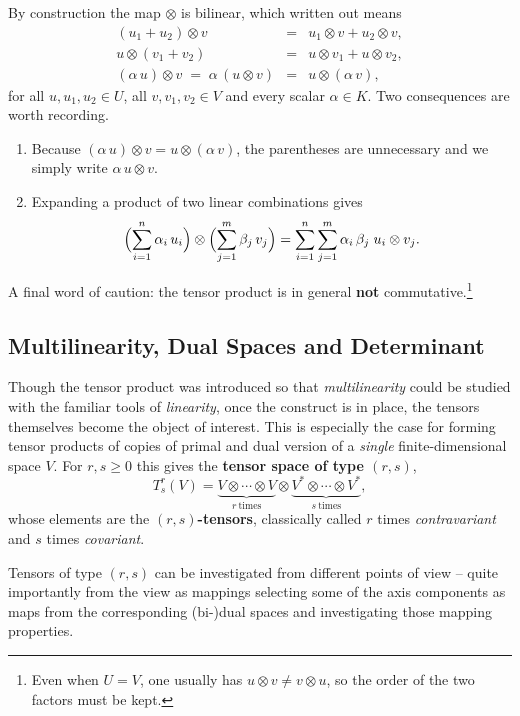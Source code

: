\documentclass{article}
\begin{document}
By construction the map $\otimes$ is bilinear, which written out means
\[
	\begin{array}{rcl}
		(u_1 + u_2) \otimes v & = & u_1 \otimes v + u_2 \otimes v, \\[2pt]
		u \otimes (v_1 + v_2) & = & u \otimes v_1 + u \otimes v_2, \\[2pt]
		(\alpha\, u) \otimes v \;=\; \alpha\,(u \otimes v) & = & u \otimes (\alpha\, v),
	\end{array}
\]
for all $u, u_1, u_2 \in U$, all $v, v_1, v_2 \in V$ and every scalar $\alpha \in K$.
Two consequences are worth recording.
\begin{enumerate}
	\item Because $(\alpha\, u) \otimes v = u \otimes (\alpha\, v)$, the parentheses are unnecessary and we simply write $\alpha\, u \otimes v$.
	\item Expanding a product of two linear combinations gives
	\[
		\Bigl( \sum_{i=1}^{n} \alpha_i\, u_i \Bigr) \otimes \Bigl( \sum_{j=1}^{m} \beta_j\, v_j \Bigr)
		= \sum_{i=1}^{n} \sum_{j=1}^{m} \alpha_i\, \beta_j \; u_i \otimes v_j .
	\]
\end{enumerate}

A final word of caution: the tensor product is in general \textbf{not} commutative.\footnote{Even when $U = V$, one usually has $u \otimes v \neq v \otimes u$, so the order of the two factors must be kept.}

\subsection{Multilinearity, Dual Spaces and Determinant}\label{subsec:rstensors}
Though the tensor product was introduced so that \emph{multilinearity} could be studied with the familiar tools of \emph{linearity}, once the construct is in place, the tensors themselves become the object of interest.
This is especially the case for forming tensor products of copies of primal and dual version of a \emph{single} finite-dimensional space $V$.
For $r, s \ge 0$ this gives the \textbf{tensor space of type $(r,s)$},
\[
	T^{r}_{s}(V) = \underbrace{V \otimes \cdots \otimes V}_{r\ \mathrm{times}} \otimes \underbrace{V^{*} \otimes \cdots \otimes V^{*}}_{s\ \mathrm{times}},
\]
whose elements are the \textbf{$(r,s)$-tensors}, classically called $r$ times \emph{contravariant} and $s$ times \emph{covariant}.

Tensors of type $(r,s)$ can be investigated from different points of view -- quite importantly from the view as mappings selecting some of the axis components as maps from the corresponding (bi-)dual spaces and investigating those mapping properties.
\end{document}
